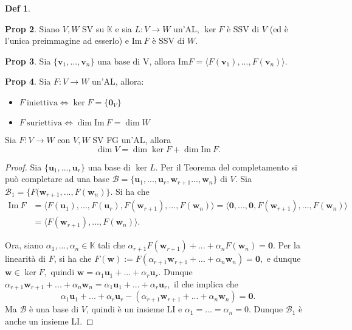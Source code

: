 \documentclass[]{article}
\newcommand{\bl}[1]{\mathbf{#1}}
\newcommand{\vu}{\mathbf{u}}
\newcommand{\vv}{\mathbf{v}}
\newcommand{\vw}{\mathbf{w}}
\theoremstyle{definition}
\theoremstyle{definition}
\newtheorem{prop}{Prop}[subsection]
\theoremstyle{definition}
\newtheorem{dfn}[prop]{Def}
\begin{document}
\begin{dfn}
\end{dfn} \begin{prop} Siano $V,W$ SV su $\mathbb{K}$ e sia $L:V \to W$ un'AL, $\ker F$ è SSV di $V$ (ed è l'unica preimmagine ad esserlo) e  $\mathrm{Im} \ F$ è SSV di $W$.

\end{prop} \begin{prop} Sia $\{ \vv _1 ,..., \vv _n \}$ una base di V, allora $\mathrm{Im}F=\langle F( \vv _1 ) ,..., F( \vv _n )\rangle $.

\end{prop} \begin{prop} Sia $F: V \to W$ un'AL, allora:
\begin{itemize}
	\item $F \ \mathrm{iniettiva} \Leftrightarrow \ker F = \{ \bl{0}_V \}$
	\item $F  \ \mathrm{suriettiva} \Leftrightarrow \dim \mathrm{Im}\ F = \dim W$
\end{itemize}

\end{prop} 
\begin{thm} Sia $F: V \to W$ con $V,W$ SV FG un'AL, allora 
$$\dim V = \dim \ker F + \dim \mathrm{Im}\ F.$$
\end{thm} 
\begin{proof}
Sia $\{ \vu_1,...,\vu_r\}$ una base di $\ker L.$ Per il Teorema del completamento si può completare ad una base $\mathcal{B}=\{ \vu_1,...,\vu_r, \vw_{r+1} ...,\vw_n\}$ di $V.$ Sia $\mathcal{B}_1=\{F(\vw_{r+1},...,F(\vw_n)\}$. Si ha che
\begin{align*}
\mathrm{Im}\ F &= \langle F(\vu_1),...,F(\vu_r), F(\vw_{r+1}),...,F(\vw_n) \rangle=\langle \bl{0},...,\bl{0},F(\vw_{r+1}),...,F(\vw_n) \rangle \\ &= \langle F(\vw_{r+1}), ...,F(\vw_n) \rangle.
\end{align*}

Ora, siano $\alpha_1,...,\alpha_n \in \mathbb{K}$ tali che $\alpha_{r+1} F(\vw_{r+1}) +...+ \alpha_n F(\vw_n) = \bl{0}.$ Per la linearità di $F$, si ha che $F(\vw):=F(\alpha_{r+1} \vw_{r+1} +...+\alpha_n \vw_n) = \bl{0},$ e dunque $\vw \in \ker F,$ quindi $\vw=\alpha_1 \vu_1 +...+ \alpha_r \vu_r.$ Dunque $\alpha_{r+1} \vw_{r+1} +...+\alpha_n \vw_n=\alpha_1 \vu_1 +...+ \alpha_r \vu_r,$ il che implica che
$$\alpha_1 \vu_1 +...+ \alpha_r \vu_r-(\alpha_{r+1} \vw_{r+1} +...+\alpha_n \vw_n)=\bl{0}.$$
Ma $\mathcal{B}$ è una base di $V$, quindi è un insieme LI e $\alpha_1=...=\alpha_n=0.$ Dunque $\mathcal{B}_1$ è anche un insieme LI.
\end{proof}
\end{document}
